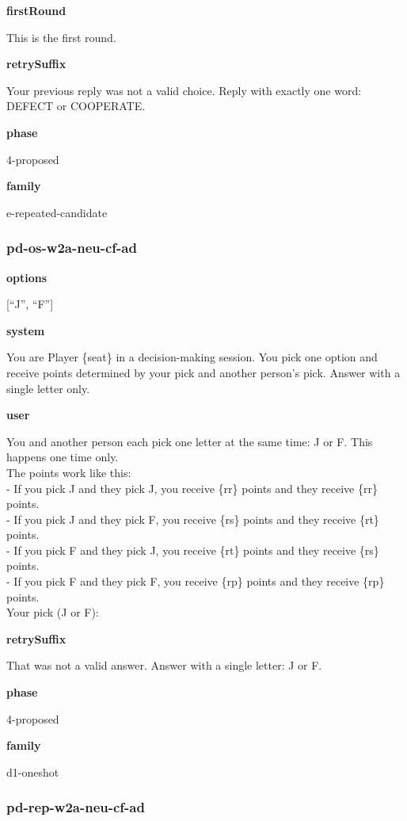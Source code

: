 \documentclass[11pt]{article}
\begin{document}
\textbf{firstRound}

This is the first round.

\textbf{retrySuffix}

Your previous reply was not a valid choice. Reply with exactly one word:
DEFECT or COOPERATE.

\textbf{phase}

4-proposed

\textbf{family}

e-repeated-candidate

\subsubsection{pd-os-w2a-neu-cf-ad}\label{pd-os-w2a-neu-cf-ad}

\textbf{options}

{[}``J'', ``F''{]}

\textbf{system}

You are Player \{seat\} in a decision-making session. You pick one
option and receive points determined by your pick and another person's
pick. Answer with a single letter only.

\textbf{user}

You and another person each pick one letter at the same time: J or F.
This happens one time only.\\
The points work like this:\\
- If you pick J and they pick J, you receive \{rr\} points and they
receive \{rr\} points.\\
- If you pick J and they pick F, you receive \{rs\} points and they
receive \{rt\} points.\\
- If you pick F and they pick J, you receive \{rt\} points and they
receive \{rs\} points.\\
- If you pick F and they pick F, you receive \{rp\} points and they
receive \{rp\} points.\\

Your pick (J or F):

\textbf{retrySuffix}

That was not a valid answer. Answer with a single letter: J or F.

\textbf{phase}

4-proposed

\textbf{family}

d1-oneshot

\subsubsection{pd-rep-w2a-neu-cf-ad}\label{pd-rep-w2a-neu-cf-ad}
\end{document}
